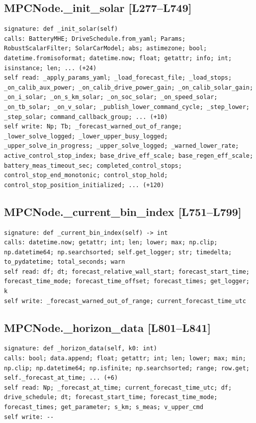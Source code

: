 \documentclass[a4paper,10pt,oneside]{book}
\begin{document}
\subsection*{MPCNode.\_init\_solar [L277--L749]}
\begin{lstlisting}[numbers=none]
signature: def _init_solar(self)
calls: BatteryMHE; DriveSchedule.from_yaml; Params; RobustScalarFilter; SolarCarModel; abs; astimezone; bool; datetime.fromisoformat; datetime.now; float; getattr; info; int; isinstance; len; ... (+24)
self read: _apply_params_yaml; _load_forecast_file; _load_stops; _on_calib_aux_power; _on_calib_drive_power_gain; _on_calib_solar_gain; _on_i_solar; _on_s_km_solar; _on_soc_solar; _on_speed_solar; _on_tb_solar; _on_v_solar; _publish_lower_command_cycle; _step_lower; _step_solar; command_callback_group; ... (+10)
self write: Np; Tb; _forecast_warned_out_of_range; _lower_solve_logged; _lower_upper_busy_logged; _upper_solve_in_progress; _upper_solve_logged; _warned_lower_rate; active_control_stop_index; base_drive_eff_scale; base_regen_eff_scale; battery_meas_timeout_sec; completed_control_stops; control_stop_end_monotonic; control_stop_hold; control_stop_position_initialized; ... (+120)
\end{lstlisting}
\subsection*{MPCNode.\_current\_bin\_index [L751--L799]}
\begin{lstlisting}[numbers=none]
signature: def _current_bin_index(self) -> int
calls: datetime.now; getattr; int; len; lower; max; np.clip; np.datetime64; np.searchsorted; self.get_logger; str; timedelta; to_pydatetime; total_seconds; warn
self read: df; dt; forecast_relative_wall_start; forecast_start_time; forecast_time_mode; forecast_time_offset; forecast_times; get_logger; k
self write: _forecast_warned_out_of_range; current_forecast_time_utc
\end{lstlisting}
\subsection*{MPCNode.\_horizon\_data [L801--L841]}
\begin{lstlisting}[numbers=none]
signature: def _horizon_data(self, k0: int)
calls: bool; data.append; float; getattr; int; len; lower; max; min; np.clip; np.datetime64; np.isfinite; np.searchsorted; range; row.get; self._forecast_at_time; ... (+6)
self read: Np; _forecast_at_time; current_forecast_time_utc; df; drive_schedule; dt; forecast_start_time; forecast_time_mode; forecast_times; get_parameter; s_km; s_meas; v_upper_cmd
self write: --
\end{lstlisting}
\end{document}
